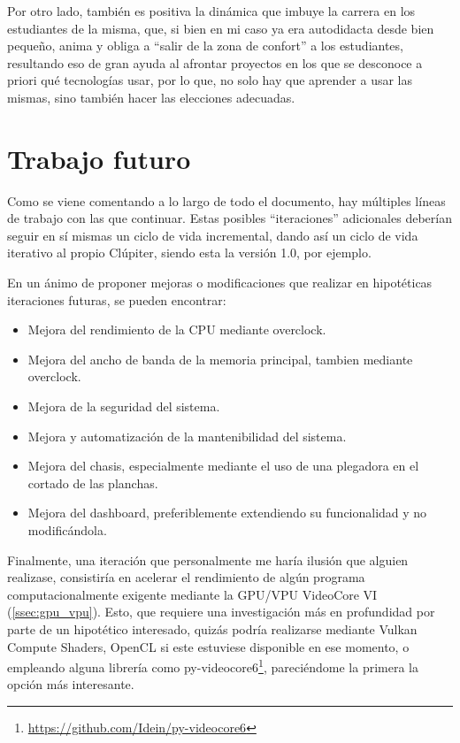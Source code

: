 Por otro lado, también es positiva la dinámica que imbuye la carrera en los estudiantes de la misma, que, si bien en mi caso ya era autodidacta desde bien pequeño, anima y obliga a ``salir de la zona de confort'' a los estudiantes, resultando eso de gran ayuda al afrontar proyectos en los que se desconoce a priori qué tecnologías usar, por lo que, no solo hay que aprender a usar las mismas, sino también hacer las elecciones adecuadas.

\section{Trabajo futuro}
Como se viene comentando a lo largo de todo el documento, hay múltiples líneas de trabajo con las que continuar. Estas posibles ``iteraciones'' adicionales deberían seguir en sí mismas un ciclo de vida incremental, dando así un ciclo de vida iterativo al propio Clúpiter, siendo esta la versión 1.0, por ejemplo.

En un ánimo de proponer mejoras o modificaciones que realizar en hipotéticas iteraciones futuras, se pueden encontrar:
\begin{itemize}
    \item Mejora del rendimiento de la CPU mediante \gls{overclock}.
    \item Mejora del ancho de banda de la memoria principal, tambien mediante \gls{overclock}.
    \item Mejora de la seguridad del sistema.
    \item Mejora y automatización de la mantenibilidad del sistema.
    \item Mejora del chasis, especialmente mediante el uso de una plegadora en el cortado de las planchas.
    \item Mejora del dashboard, preferiblemente extendiendo su funcionalidad y no modificándola.
\end{itemize}

Finalmente, una iteración que personalmente me haría ilusión que alguien realizase, consistiría en acelerar el rendimiento de algún programa computacionalmente exigente mediante la GPU/VPU VideoCore VI (\ref{ssec:gpu_vpu}). Esto, que requiere una investigación más en profundidad por parte de un hipotético interesado, quizás podría realizarse mediante Vulkan Compute Shaders, OpenCL si este estuviese disponible en ese momento, o empleando alguna librería como py-videocore6\footnote{\url{https://github.com/Idein/py-videocore6}}, pareciéndome la primera la opción más interesante.
